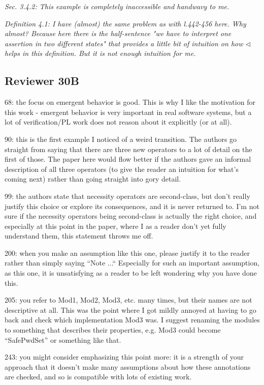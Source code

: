 \documentclass[11pt]{amsart}
\newcommand{\rev}[1]{\emph #1}
\begin{document}
{\rev {{Sec. 3.4.2: This example is completely inaccessible and handwavy to me. }}}

{\rev {{ Definition 4.1: I have (almost) the same problem as with l.442-456 here. Why almost? Because here there is the half-sentence "we have to interpret one assertion in two different states" that provides a little bit of intuition on how $\triangleleft$ helps in this definition. But it is not enough intuition for me. }}}

   
  \subsection*{Reviewer 30B}
  
   68: the focus on emergent behavior is good. This is why I like the motivation for this work - emergent behavior is very important in real software systems, but a lot of verification/PL work does not reason about it explicitly (or at all).

90: this is the first example I noticed of a weird transition. The authors go straight from saying that there are three new operators to a lot of detail on the first of those. The paper here would flow better if the authors gave an informal description of all three operators (to give the reader an intuition for what’s coming next) rather than going straight into gory detail.

99: the authors state that necessity operators are second-class, but don’t really justify this choice or explore its consequences, and it is never returned to. I’m not sure if the necessity operators being second-class is actually the right choice, and especially at this point in the paper, where I as a reader don’t yet fully understand them, this statement throws me off.

200: when you make an assumption like this one, please justify it to the reader rather than simply saying “Note ...“ Especially for such an important assumption, as this one, it is unsatisfying as a reader to be left wondering why you have done this.

205: you refer to Mod1, Mod2, Mod3, etc. many times, but their names are not descriptive at all. This was the point where I got mildly annoyed at having to go back and check which implementation Mod3 was. I suggest renaming the modules to something that describes their properties, e.g. Mod3 could become “SafePwdSet” or something like that.

243: you might consider emphasizing this point more: it is a strength of your approach that it doesn’t make many assumptions about how these annotations are checked, and so is compatible with lots of existing work.
\end{document}

